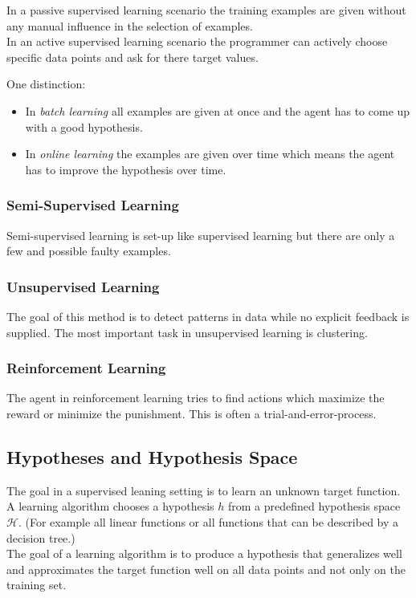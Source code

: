 \documentclass[english]{panikzettel}
\begin{document}
In a passive supervised learning scenario the training examples are given without any manual influence in the selection of examples.\\
In an active supervised learning scenario the programmer can actively choose specific data points and ask for there target values.

One distinction:
\begin{itemize}
\item In \emph{batch learning} all examples are given at once and the agent has to come up with a good hypothesis.
\item In \emph{online learning} the examples are given over time which means the agent has to improve the hypothesis over time.
\end{itemize}

\subsubsection{Semi-Supervised Learning}
Semi-supervised learning is set-up like supervised learning but there are only a few and possible faulty examples.

\subsubsection{Unsupervised Learning}
The goal of this method is to detect patterns in data while no explicit feedback is supplied. The most important task in unsupervised learning is clustering.

\subsubsection{Reinforcement Learning}
The agent in reinforcement learning tries to find actions which maximize the reward or minimize the punishment. This is often a trial-and-error-process.


\subsection{Hypotheses and Hypothesis Space}
The goal in a supervised leaning setting is to learn an unknown target function. A learning algorithm chooses a hypothesis $h$ from a predefined hypothesis space $\mathcal{H}$. (For example all linear functions or all functions that can be described by a decision tree.)\\
The goal of a learning algorithm is to produce a hypothesis that generalizes well and approximates the target function well on all data points and not only on the training set.
\end{document}
